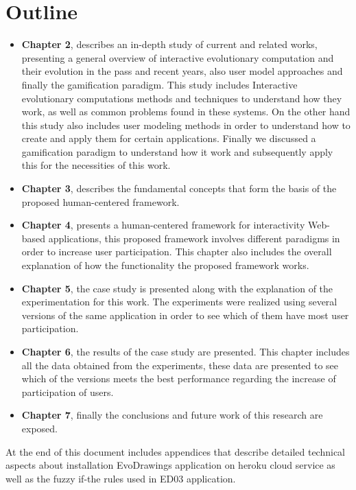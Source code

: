 \section{Outline}

\begin{itemize}
\item \textbf{Chapter 2}, describes an in-depth study of current and related
works, presenting a general overview of interactive evolutionary computation and
their evolution in the pass and recent years, also user model approaches and
finally the gamification paradigm. This study includes Interactive evolutionary
computations methods and techniques to understand how they work, as well as
common problems found in these systems. On the other hand this study also includes user
modeling methods in order to understand how to create and apply them for certain
applications. Finally we discussed a gamification paradigm to
understand how it work and subsequently apply this for the necessities of this
work.

\item \textbf{Chapter 3}, describes the fundamental
concepts that form the basis of the proposed human-centered framework.

\item \textbf{Chapter 4}, presents a human-centered framework for interactivity
Web-based applications, this proposed framework involves different paradigms in
order to increase user participation. This chapter also includes the overall
explanation of how the functionality the proposed framework works.

\item \textbf{Chapter 5}, the case study is presented along with the
explanation of the experimentation for this work. The experiments were realized
using several versions of the same application in order to see which of them
have most user participation.

\item \textbf{Chapter 6}, the results of the case study are presented. This
chapter includes all the data obtained from the experiments, these data are
presented to see which of the versions meets the best performance regarding the
increase of participation of users.

\item \textbf{Chapter 7}, finally the conclusions and future work of this
research are exposed.
\end{itemize}

At the end of this document includes appendices that describe
detailed technical aspects about installation EvoDrawings application on heroku
cloud service as well as the fuzzy if-the rules used in ED03 application.
